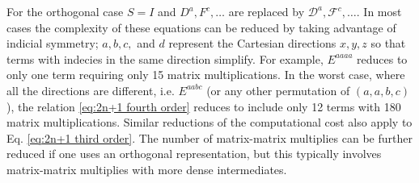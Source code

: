 \documentclass[prl,aps,preprint,showpacs,superbib]{revtex4}
\def\F{\mathcal{F}}
\def\D{\mathcal{D}}
\begin{document}
For the orthogonal case $S=I$ and $D^a,F^c,\ldots$ are replaced by $\D^a,\F^c,\ldots$.
In most cases the complexity of these equations
can be reduced by taking advantage of indicial symmetry; 
$a,b,c,$ and $d$ represent the Cartesian directions $x,y,z$
so that terms with indecies in the same direction simplify. 
For example, $E^{aaaa}$ reduces to only one term requiring only 15 matrix multiplications.
In the worst case, where all the directions are different, i.e. $E^{aabc}$ 
(or any other permutation of $(a,a,b,c)$), the relation \eqref{eq:2n+1 fourth order} 
reduces to include only 12 terms with 180 matrix multiplications. 
Similar reductions of the computational cost also apply to 
Eq. \eqref{eq:2n+1 third order}. The number of matrix-matrix multiplies can be further reduced
if one uses an orthogonal representation, but this typically involves matrix-matrix multiplies 
with more dense intermediates.
\end{document}
